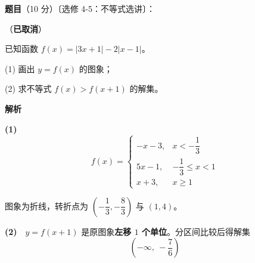\begin{answer}

\textbf{题目}（10 分）〔选修 4-5：不等式选讲〕：

（\textbf{已取消}）

已知函数 $f(x)=|3x+1|-2|x-1|$。

  (1) 画出 $y=f(x)$ 的图象；

  (2) 求不等式 $f(x)>f(x+1)$ 的解集。

\par\medskip

\Needspace{0.1\textheight}

\textbf{解析}

\textbf{(1)}
\nopagebreak[4]
\[f(x)=\begin{cases}-x-3,&x<-\dfrac13\\[2mm] 5x-1,&-\dfrac13\le x<1\\[2mm] x+3,&x\ge1\end{cases}\]

图象为折线，转折点为 $\left(-\dfrac13,-\dfrac83\right)$ 与 $(1,4)$。

\textbf{(2)}　$y=f(x+1)$ 是原图象\textbf{左移 $1$ 个单位}。分区间比较后得解集
\nopagebreak[4]
\[\left(-\infty,\ -\frac76\right)\]

\enlargethispage{4\baselineskip}



\end{answer}